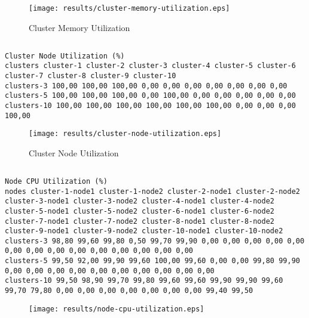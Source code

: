 \documentclass{elsart}
\begin{document}
\begin{figure}[ht]
\centering
\texttt{[image: results/cluster-memory-utilization.eps]}
\caption{Cluster Memory Utilization}\label{fig:cluster-memory-utilization.eps}
\end{figure}

\subsection{}

\begin{lstlisting}[caption={Cluster Node Utilization}]
Cluster Node Utilization (%)
clusters cluster-1 cluster-2 cluster-3 cluster-4 cluster-5 cluster-6 cluster-7 cluster-8 cluster-9 cluster-10
clusters-3 100,00 100,00 100,00 0,00 0,00 0,00 0,00 0,00 0,00 0,00
clusters-5 100,00 100,00 100,00 0,00 100,00 0,00 0,00 0,00 0,00 0,00
clusters-10 100,00 100,00 100,00 100,00 100,00 100,00 0,00 0,00 0,00 100,00
\end{lstlisting}

\begin{figure}[ht]
\centering
\texttt{[image: results/cluster-node-utilization.eps]}
\caption{Cluster Node Utilization}\label{fig:cluster-node-utilization.eps}
\end{figure}

\subsection{}

\begin{lstlisting}[caption={}]
Node CPU Utilization (%)
nodes cluster-1-node1 cluster-1-node2 cluster-2-node1 cluster-2-node2 cluster-3-node1 cluster-3-node2 cluster-4-node1 cluster-4-node2 cluster-5-node1 cluster-5-node2 cluster-6-node1 cluster-6-node2 cluster-7-node1 cluster-7-node2 cluster-8-node1 cluster-8-node2 cluster-9-node1 cluster-9-node2 cluster-10-node1 cluster-10-node2
clusters-3 98,80 99,60 99,80 0,50 99,70 99,90 0,00 0,00 0,00 0,00 0,00 0,00 0,00 0,00 0,00 0,00 0,00 0,00 0,00 0,00
clusters-5 99,50 92,00 99,90 99,60 100,00 99,60 0,00 0,00 99,80 99,90 0,00 0,00 0,00 0,00 0,00 0,00 0,00 0,00 0,00 0,00
clusters-10 99,50 98,90 99,70 99,80 99,60 99,60 99,90 99,90 99,60 99,70 79,80 0,00 0,00 0,00 0,00 0,00 0,00 0,00 99,40 99,50
\end{lstlisting}

\begin{figure}[ht]
\centering
\texttt{[image: results/node-cpu-utilization.eps]}
\caption{}\label{fig:node-cpu-utilization.eps}
\end{figure}
\end{document}
